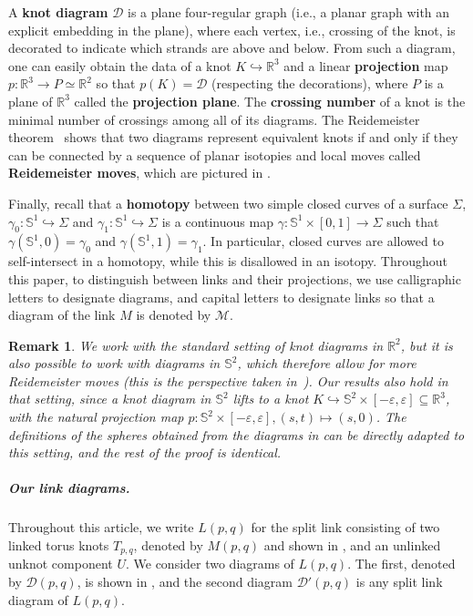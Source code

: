 \documentclass{article}
\newcommand{\Sp}{\mathbb{S}}
\newtheorem{remark}[theorem]{Remark}
\begin{document}
A \textbf{knot diagram} $\mathcal{D}$ is a plane four-regular graph (i.e., a planar graph with an explicit embedding in the plane), where each vertex, i.e., crossing of the knot, is decorated to indicate which strands are above and below. From such a diagram, one can easily obtain the data of a knot $K \hookrightarrow \mathbb{R}^3$ and a linear \textbf{projection} map $p: \mathbb{R}^3 \rightarrow P \simeq \mathbb{R}^2$ so that $p(K)=\mathcal{D}$ (respecting the decorations), where $P$ is a plane of $\mathbb{R}^3$ called the \textbf{projection plane}. The \textbf{crossing number} of a knot is the minimal number of crossings among all of its diagrams. The Reidemeister theorem~\cite{Reidemeister_reidemeister_th} shows that two diagrams represent equivalent knots if and only if they can be connected by a sequence of planar isotopies and local moves called \textbf{Reidemeister moves}, which are pictured in . 

Finally, recall that a \textbf{homotopy} between two simple closed curves of a surface $\Sigma$, $\gamma_0:\mathbb{S}^1 \hookrightarrow \Sigma$ and $\gamma_1:\mathbb{S}^1 \hookrightarrow \Sigma$ is a continuous map $\gamma:\mathbb{S}^1 \times [0,1] \rightarrow \Sigma$ such that $\gamma (\mathbb{S}^1,0)=\gamma_0$ and $\gamma (\mathbb{S}^1,1)=\gamma_1$. In particular, closed curves are allowed to self-intersect in a homotopy, while this is disallowed in an isotopy. Throughout this paper, to distinguish between links and their projections, we use calligraphic letters to designate diagrams, and capital letters to designate links so that a diagram of the link $M$ is denoted by $\mathcal{M}$.

\begin{remark}
We work with the standard setting of knot diagrams in $\mathbb{R}^2$, but it is also possible to work with diagrams in $\Sp^2$, which therefore allow for more Reidemeister moves (this is the perspective taken in~\cite{Mesmay_hard_unknot}). Our results also hold in that setting, since a knot diagram in $\Sp^2$ lifts to a knot $K \hookrightarrow \Sp^2 \times [-\varepsilon,\varepsilon] \subseteq \mathbb{R}^3$, with the natural projection map $p:\Sp^2 \times [-\varepsilon,\varepsilon], (s,t) \mapsto (s,0)$. The definitions of the spheres obtained from the diagrams in  can be directly adapted to this setting, and the rest of the proof is identical.
\end{remark}

\subparagraph*{Our link diagrams.} Throughout this article, we write $L(p,q)$ for the split link consisting of two linked torus knots $T_{p,q}$, denoted by $M(p,q)$ and shown in , and an unlinked unknot component $U$. We consider two diagrams of $L(p,q)$. The first, denoted by $\mathcal{D}(p,q)$, is shown in , and the second diagram $\mathcal{D}'(p,q)$ is any split link diagram of $L(p,q)$.
\end{document}
